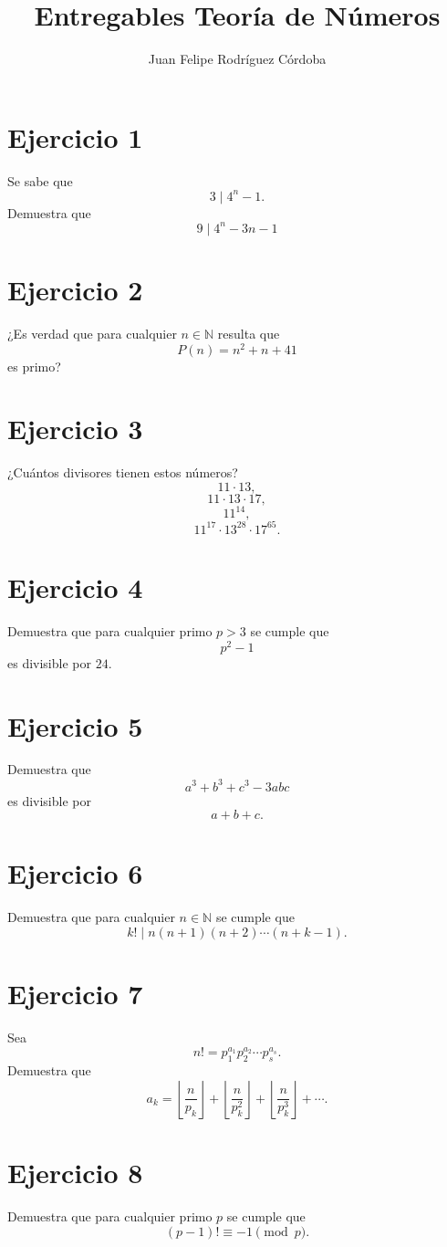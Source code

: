 \documentclass[12pt]{article}
\title{Entregables Teoría de Números}
\author{Juan Felipe Rodríguez Córdoba}
\date{}
\begin{document}
\maketitle

\section*{Ejercicio 1}
Se sabe que
\[
3 \mid 4^n - 1.
\]
Demuestra que
\[
9 \mid 4^n - 3n - 1
\]

\section*{Ejercicio 2}
¿Es verdad que para cualquier \(n \in \mathbb{N}\) resulta que
\[
P(n)=n^2+n+41
\]
es primo?

\section*{Ejercicio 3}
¿Cuántos divisores tienen estos números?
\[
11\cdot 13,
\]
\[
11\cdot 13\cdot 17,
\]
\[
11^{14},
\]
\[
11^{17}\cdot 13^{28}\cdot 17^{65}.
\]

\section*{Ejercicio 4}
Demuestra que para cualquier primo \(p>3\) se cumple que
\[
p^2-1
\]
es divisible por \(24\).

\section*{Ejercicio 5}
Demuestra que
\[
a^3+b^3+c^3-3abc
\]
es divisible por
\[
a+b+c.
\]

\section*{Ejercicio 6}
Demuestra que para cualquier \(n\in\mathbb{N}\) se cumple que
\[
k! \mid n(n+1)(n+2)\cdots(n+k-1).
\]

\section*{Ejercicio 7}
Sea
\[
n! = p_1^{a_1}p_2^{a_2}\cdots p_s^{a_s}.
\]
Demuestra que
\[
a_k=
\left\lfloor \frac{n}{p_k}\right\rfloor+
\left\lfloor \frac{n}{p_k^2}\right\rfloor+
\left\lfloor \frac{n}{p_k^3}\right\rfloor+\cdots.
\]

\section*{Ejercicio 8}
Demuestra que para cualquier primo \(p\) se cumple que
\[
(p-1)! \equiv -1 \pmod p.
\]
\end{document}

